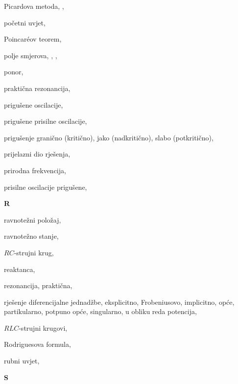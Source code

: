 \begin{theindex}
  \item Picardova metoda, , 
  \item po\v cetni uvjet, 
  \item Poincar\'eov teorem, 
  \item polje smjerova, , , 
  \item ponor, 
  \item prakti\v cna rezonancija, 
  \item prigu\v sene oscilacije, 
  \item prigu\v sene prisilne oscilacije, 
  \item prigu\v senje
    \subitem grani\v cno (kriti\v cno), 
    \subitem jako (nadkriti\v cno), 
    \subitem slabo (potkriti\v cno), 
  \item prijelazni dio rje\v senja, 
  \item prirodna frekvencija, 
  \item prisilne oscilacije
    \subitem prigu\v sene, 

  \indexspace
{\bfseries\hfil R\hfil}\nopagebreak

  \item ravnote\v zni polo\v zaj, 
  \item ravnote\v zno stanje, 
  \item $RC$-strujni krug, 
  \item reaktanca, 
  \item rezonancija, 
    \subitem prakti\v cna, 
  \item rje\v senje diferencijalne jednad\v zbe, 
    \subitem eksplicitno, 
    \subitem Frobeniusovo, 
    \subitem implicitno, 
    \subitem op\'ce, 
    \subitem partikularno, 
    \subitem potpuno op\'ce, 
    \subitem singularno, 
    \subitem u obliku reda potencija, 
  \item $RLC$-strujni krugovi, 
  \item Rodriguesova formula, 
  \item rubni uvjet, 

  \indexspace
{\bfseries\hfil S\hfil}\nopagebreak


\end{theindex}
